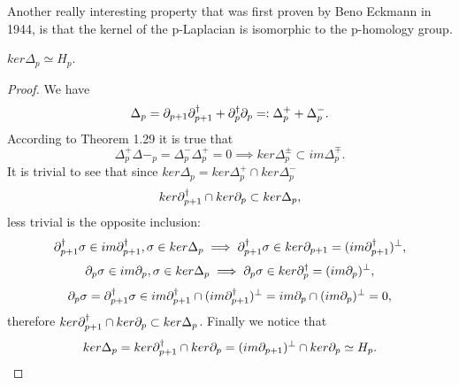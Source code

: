 \documentclass[../1.tex]{subfiles}
\begin{document}
    Another really interesting property that was first proven by Beno Eckmann in 1944, is that the kernel of the p-Laplacian
    is isomorphic to the p-homology group.

    \begin{thm}
        $ker\Delta_p \simeq H_p$.
    \end{thm}
    \begin{proof}
        We have \[ \Delta_p = \partial_{p+1}\partial^\dagger_{p+1} + \partial^\dagger_p\partial_p =: \Delta^+_p + \Delta^-_p.\]
        According to Theorem 1.29 it is true that
        \[  \Delta^+_p\Delta-_p = \Delta^-_p\Delta^+_p = 0\implies ker\Delta^{\pm}_p \subset im\Delta^{\mp}_p.\]
        It is trivial to see that since $ker\Delta_p = ker\Delta^+_p \cap ker\Delta^-_p $
        \[ ker\partial^\dagger_{p+1} \cap ker\partial_p \subset ker\Delta_p,\] less trivial is the opposite inclusion:
        \[ \partial^\dagger_{p+1}\sigma \in im\partial^\dagger_{p+1},\sigma \in ker\Delta_p \implies \partial^\dagger_{p+1}\sigma \in ker\partial_{p+1} = (im\partial^\dagger_{p+1})^\perp,\]
        \[ \partial_p\sigma \in im\partial_p,\sigma \in ker\Delta_p \implies \partial_p\sigma \in ker\partial^\dagger_p= (im\partial_p)^\perp,\]
        \[ \partial_p\sigma = \partial^\dagger_{p+1}\sigma \in im\partial^\dagger_{p+1} \cap (im\partial^\dagger_{p+1})^\perp = im\partial_p \cap (im\partial_p)^\perp = 0,\]
        therefore $ker\partial^\dagger_{p+1} \cap ker\partial_p \subset ker\Delta_p$. Finally we notice that
        \[ ker\Delta_p = ker\partial^\dagger_{p+1} \cap ker\partial_p = (im\partial_{p+1})^\perp \cap ker\partial_p \simeq H_p.\]
    \end{proof}
\end{document}
